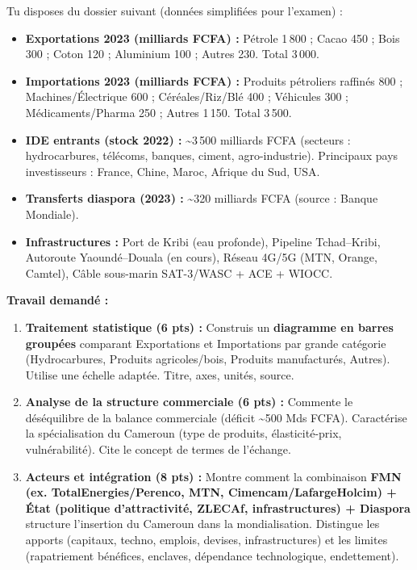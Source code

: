 \documentclass[11pt]{article}
\newcommand{\cle}[1]{{\popxbold\color{popdark}#1}}
\begin{document}
\begin{exercice}
Tu disposes du dossier suivant (données simplifiées pour l'examen) :
\begin{itemize}
    \item \textbf{Exportations 2023 (milliards FCFA) :} Pétrole 1\,800 ; Cacao 450 ; Bois 300 ; Coton 120 ; Aluminium 100 ; Autres 230. Total 3\,000.
    \item \textbf{Importations 2023 (milliards FCFA) :} Produits pétroliers raffinés 800 ; Machines/Électrique 600 ; Céréales/Riz/Blé 400 ; Véhicules 300 ; Médicaments/Pharma 250 ; Autres 1\,150. Total 3\,500.
    \item \textbf{IDE entrants (stock 2022) :} \textasciitilde 3\,500 milliards FCFA (secteurs : hydrocarbures, télécoms, banques, ciment, agro-industrie). Principaux pays investisseurs : France, Chine, Maroc, Afrique du Sud, USA.
    \item \textbf{Transferts diaspora (2023) :} \textasciitilde 320 milliards FCFA (source : Banque Mondiale).
    \item \textbf{Infrastructures :} Port de Kribi (eau profonde), Pipeline Tchad--Kribi, Autoroute Yaoundé--Douala (en cours), Réseau 4G/5G (MTN, Orange, Camtel), Câble sous-marin SAT-3/WASC + ACE + WIOCC.
\end{itemize}

\textbf{Travail demandé :}
\begin{enumerate}
    \item \textbf{Traitement statistique (6 pts) :} Construis un \textbf{diagramme en barres groupées} comparant Exportations et Importations par grande catégorie (Hydrocarbures, Produits agricoles/bois, Produits manufacturés, Autres). Utilise une échelle adaptée. Titre, axes, unités, source.
    \item \textbf{Analyse de la structure commerciale (6 pts) :} Commente le déséquilibre de la balance commerciale (déficit \textasciitilde 500 Mds FCFA). Caractérise la \cle{spécialisation} du Cameroun (type de produits, élasticité-prix, vulnérabilité). Cite le concept de \cle{termes de l'échange}.
    \item \textbf{Acteurs et intégration (8 pts) :} Montre comment la combinaison \textbf{FMN (ex. TotalEnergies/Perenco, MTN, Cimencam/LafargeHolcim) + État (politique d'attractivité, ZLECAf, infrastructures) + Diaspora} structure l'insertion du Cameroun dans la mondialisation. Distingue les apports (capitaux, techno, emplois, devises, infrastructures) et les limites (rapatriement bénéfices, enclaves, dépendance technologique, endettement).
\end{enumerate}
\end{exercice}
\end{document}
